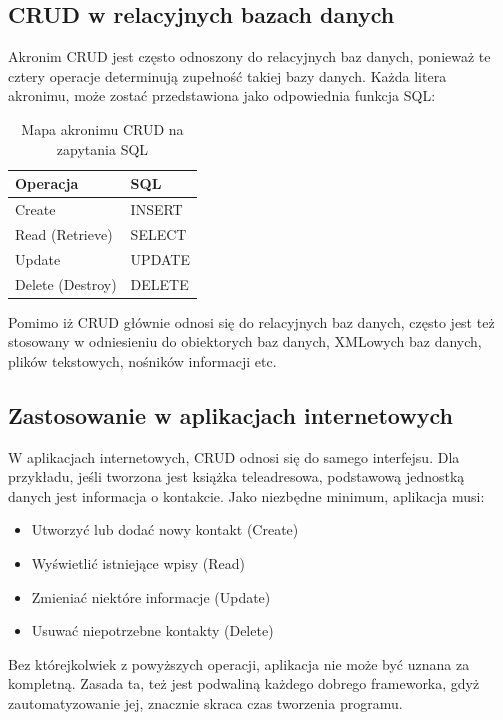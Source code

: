 \documentclass[a4paper,12pt,oneside]{report}
\begin{document}
\subsection{CRUD w relacyjnych bazach danych}
\label{sub:crud-db}
Akronim CRUD jest często odnoszony do relacyjnych baz danych, ponieważ te cztery operacje determinują zupełność takiej bazy danych. Każda litera akronimu, może zostać przedstawiona jako odpowiednia funkcja SQL:
\begin{table}[h]
  \begin{center}
    \begin{tabular}{|l|l|} \hline
    Operacja         & SQL \\\hline
    Create           & INSERT \\
    Read (Retrieve)  & SELECT \\
    Update           & UPDATE \\
    Delete (Destroy) & DELETE \\\hline
    \end{tabular}
    \caption{Mapa akronimu CRUD na zapytania SQL\label{crud:sql}}
  \end{center}
\end{table}
Pomimo iż CRUD głównie odnosi się do relacyjnych baz danych, często jest też stosowany w odniesieniu do obiektorych baz danych, XMLowych baz danych, plików tekstowych, nośników informacji etc.

\subsection{Zastosowanie w aplikacjach internetowych}
\label{crud:web}
W aplikacjach internetowych, CRUD odnosi się do samego interfejsu. Dla przykładu, jeśli tworzona jest książka teleadresowa, podstawową jednostką danych jest informacja o kontakcie. Jako niezbędne minimum, aplikacja musi:

\begin{itemize}
  \item Utworzyć lub dodać nowy kontakt (Create)
  \item Wyświetlić istniejące wpisy (Read)
  \item Zmieniać niektóre informacje (Update)
  \item Usuwać niepotrzebne kontakty (Delete)
\end{itemize}

Bez którejkolwiek z powyższych operacji, aplikacja nie może być uznana za kompletną. Zasada ta, też jest podwaliną każdego dobrego frameworka, gdyż zautomatyzowanie jej, znacznie skraca czas tworzenia programu.
\end{document}
